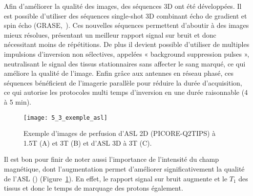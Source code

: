 Afin d’améliorer la qualité des images, des séquences 3D ont été développées. Il est possible d’utiliser des séquences single-shot 3D combinant écho de gradient et spin écho (GRASE,~\cite{Gunther2005}). Ces nouvelles séquences permettent d’aboutir à des images mieux résolues, présentant un meilleur rapport signal sur bruit et donc nécessitant moins de répétitions. De plus il devient possible d’utiliser de multiples impulsions d’inversion non sélectives, appelées « background suppression pulses », neutralisant le signal des tissus stationnaires sans affecter le sang marqué, ce qui améliore la qualité de l’image. Enfin grâce aux antennes en réseau phasé, ces séquences bénéficient de l’imagerie parallèle pour réduire la durée d’acquisition, ce qui autorise les protocoles multi temps d’inversion en une durée raisonnable (4 à 5 min).\\
\begin{figure}[!t]
\centering
\texttt{[image: 5\_3\_exemple\_asl]}
\caption{Exemple d'images de perfusion d’ASL 2D (PICORE-Q2TIPS) à 1.5T (A) et 3T (B) et d’ASL 3D à 3T (C).}
\label{fig:5_3_exemple_asl}	
\end{figure}
Il est bon pour finir de noter aussi l’importance de l’intensité du champ magnétique, dont l’augmentation permet d’améliorer significativement la qualité de l’ASL (\cite{Golay2006}) (Figure~\ref{fig:5_3_exemple_asl}). En effet, le rapport signal sur bruit augmente et le $T_1$ des tissus et donc le temps de marquage des protons également.
